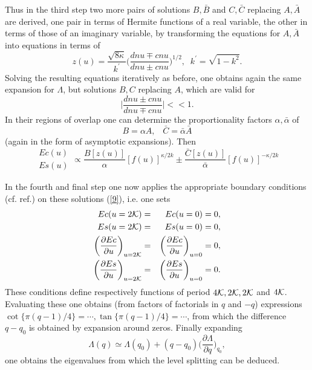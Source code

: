 \documentclass[a4paper,12pt,a4]{article}
\begin{document}
Thus in the third  step two more pairs of solutions
$B, {\bar B}$ and $C, {\bar C}$ replacing $A, {\bar A}$ are
derived, one pair in terms of Hermite functions of a real variable, the other
in terms of  those of an imaginary variable, by transforming the
equations for $A,{\bar A}$ into equations in terms of
\begin{equation}
z(u)=\frac{\sqrt{8\kappa}}{k^{\prime}}\bigg(
\frac{dn u \mp cn u}{dn u \pm cn u}\bigg)^{1/2}, \;\; k^{\prime}=
\sqrt{1-k^2}.
\label{7}
\end{equation}
Solving the resulting equations iteratively as before, one obtains
again the same expansion for $\Lambda$, but solutions
$B,C$ replacing $A$, which are valid for
$$
\bigg|\frac{dn u \pm cn u}{dn u\mp cn u}\bigg|<<1.
$$
In their regions of overlap one can determine the proportionality
factors $\alpha, {\bar \alpha}$ of
\begin{equation}
B=\alpha A, \;\;\; {\bar C} = {\bar \alpha}{\bar A}
\label{8 }
\end{equation}
(again in the form of asymptotic expansions). Then
\begin{equation}
\begin{array}{r } Ec(u) \\ Es(u)\end{array}
\propto \frac{B[z(u)]}{\alpha}[f(u)]^{\kappa/2k} \pm
 \frac{{\bar C}[z(u)]}{{\bar \alpha}}[f(u)]^{-\kappa/2k}
\label{9}
\end{equation}

In the fourth  and final step one now applies the 
appropriate  boundary conditions
(cf. ref.\cite{8}) on these solutions (\ref{9}), i.e. one sets
\begin{eqnarray}
Ec(u=2{\cal K}) &=& Ec(u=0) = 0,\nonumber\\
Es(u=2{\cal K}) &=& Es(u=0) = 0,\nonumber\\
\bigg(\frac{\partial Ec}{\partial u}\bigg)_{u=2{\cal K}}
&=&\bigg(\frac{\partial Ec}{\partial u}\bigg)_{u=0} =0,\nonumber\\
\bigg(\frac{\partial Es}{\partial u}\bigg)_{u=2{\cal K}}
&=&\bigg(\frac{\partial Es}{\partial u}\bigg)_{u=0} =0.
\label{10}
\end{eqnarray}
These conditions define respectively functions of period $4{\cal K},
2{\cal K}, 2{\cal K}$ and $ 4{\cal K}$. Evaluating these one obtains
(from factors of factorials in $q$ and $-q$)  expressions
$\cot \{\pi(q-1)/4\}=\cdots, \tan\{\pi(q-1)/4\}=\cdots $,
from which the difference $q-q_0$ is obtained by
expansion around zeros. Finally
expanding
$$
\Lambda(q)\simeq \Lambda(q_0) + (q-q_0)\bigg(\frac{\partial\Lambda}{\partial q}
\bigg)_{q_0},
$$
one obtains the eigenvalues from which the level
splitting can be deduced.
\end{document}
